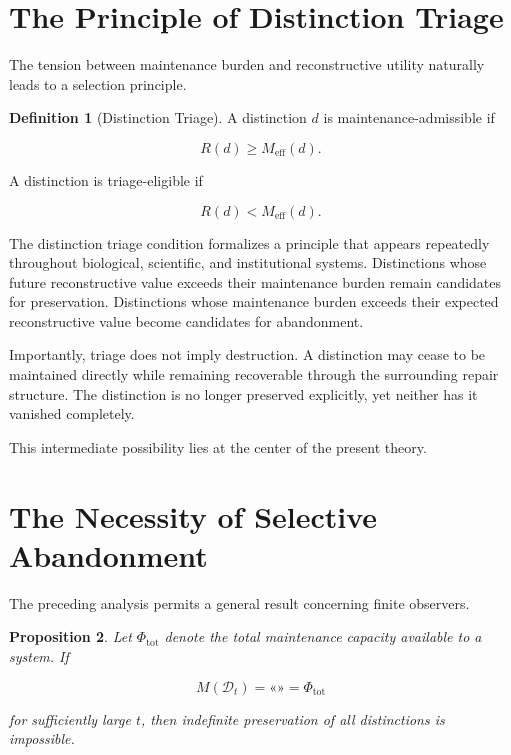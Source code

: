 \documentclass[12pt,oneside]{book}
\theoremstyle{plain} \newtheorem{theorem}{Theorem}[chapter] \newtheorem{lemma}[theorem]{Lemma} \newtheorem{proposition}[theorem]{Proposition} \newtheorem{corollary}[theorem]{Corollary}
\theoremstyle{definition} \newtheorem{definition}[theorem]{Definition} \newtheorem{axiom}[theorem]{Axiom} \newtheorem{construction}[theorem]{Construction}
\theoremstyle{remark} \newtheorem{remark}[theorem]{Remark} \newtheorem{example}[theorem]{Example}
\newcommand{\D}{\mathcal{D}} \newcommand{\R}{\mathcal{R}} \newcommand{\F}{\mathcal{F}} \newcommand{\U}{\mathcal{U}} \newcommand{\M}{\mathcal{M}} \newcommand{\G}{\Gamma}
\begin{document}
\section{The Principle of Distinction Triage}

The tension between maintenance burden and reconstructive utility naturally leads to a selection principle.

\begin{definition}[Distinction Triage]
A distinction $d$ is maintenance-admissible if

\[
R(d)\geq M_{\text{eff}}(d).
\]

A distinction is triage-eligible if

\[
R(d)<M_{\text{eff}}(d).
\]
\end{definition}

The distinction triage condition formalizes a principle that appears repeatedly throughout biological, scientific, and institutional systems. Distinctions whose future reconstructive value exceeds their maintenance burden remain candidates for preservation. Distinctions whose maintenance burden exceeds their expected reconstructive value become candidates for abandonment.

Importantly, triage does not imply destruction. A distinction may cease to be maintained directly while remaining recoverable through the surrounding repair structure. The distinction is no longer preserved explicitly, yet neither has it vanished completely.

This intermediate possibility lies at the center of the present theory.

\section{The Necessity of Selective Abandonment}

The preceding analysis permits a general result concerning finite observers.

\begin{proposition}
Let $\Phi_{\mathrm{tot}}$ denote the total maintenance capacity available to a system. If

\[
M(\D_t)
=
«»
=
\Phi_{\mathrm{tot}}
\]

for sufficiently large $t$, then indefinite preservation of all distinctions is impossible.
\end{proposition}
\end{document}
